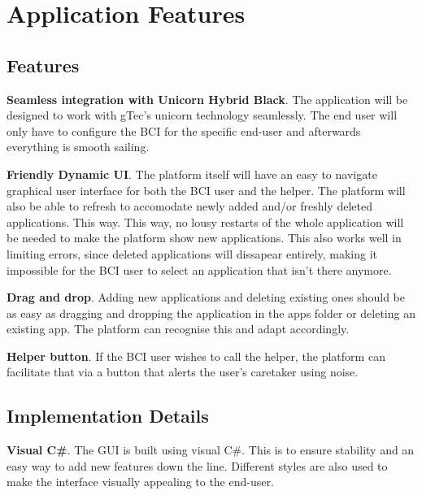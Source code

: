 
\chapter{Application Features}\label{cap:features}

\section{Features}\label{sect:features}
\textbf{Seamless integration with Unicorn Hybrid Black}. The application will be designed to work with gTec's unicorn technology seamlessly. The end user will only have to configure the BCI for the specific end-user and afterwards everything is smooth sailing.

\vspace*{2mm}
\textbf{Friendly Dynamic UI}. The platform itself will have an easy to navigate graphical user interface for both the BCI user and the helper. The platform will also be able to refresh to accomodate newly added and/or freshly deleted applications. This way. This way, no lousy restarts of the whole application will be needed to make the platform show new applications. This also works well in limiting errors, since deleted applications will dissapear entirely, making it impossible for the BCI user to select an application that isn't there anymore.

\vspace*{2mm}
\textbf{Drag and drop}. Adding new applications and deleting existing ones should be as easy as dragging and dropping the application in the apps folder or deleting an existing app. The platform can recognise this and adapt accordingly.

\vspace*{2mm}
\textbf{Helper button}. If the BCI user wishes to call the helper, the platform can facilitate that via a button that alerts the user's caretaker using noise.

\newpage


\section{Implementation Details}\label{sect:implement_details}
\textbf{Visual C\#}. The GUI is built using visual C\#. This is to ensure stability and an easy way to add new features down the line. Different styles are also used to make the interface visually appealing to the end-user.

